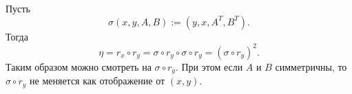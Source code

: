 \documentclass[12pt,a4paper]{article}
\begin{document}
    Пусть
    \[\sigma(x, y, A, B) := (y, x, A^T, B^T).\]
    Тогда
    \[\eta = r_x \circ r_y = \sigma \circ r_y \circ \sigma \circ r_y = (\sigma \circ r_y)^2.\]
    Таким образом можно смотреть на $\sigma \circ r_y$. При этом если $A$ и $B$ симметричны, то $\sigma \circ r_y$ не меняется как отображение от $(x, y)$.
\end{document}
